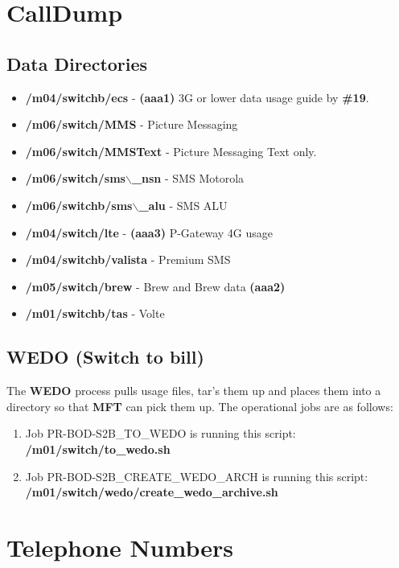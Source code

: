 \documentclass[12pt,twoside]{article}
\begin{document}
\normalsize
\section{CallDump}
\label{sec:orgheadline153}
\subsection{Data Directories}
\label{sec:orgheadline151}
\begin{itemize}
\item \textbf{/m04/switchb/ecs} - \textbf{(aaa1)} 3G or lower data usage guide by \textbf{\#19}.
\item \textbf{/m06/switch/MMS} - Picture Messaging
\item \textbf{/m06/switch/MMSText} - Picture Messaging Text only.
\item \textbf{/m06/switch/sms$\backslash$\_nsn} - SMS Motorola
\item \textbf{/m06/switchb/sms$\backslash$\_alu} - SMS ALU
\item \textbf{/m04/switch/lte} - \textbf{(aaa3)} P-Gateway 4G usage
\item \textbf{/m04/switchb/valista} - Premium SMS
\item \textbf{/m05/switch/brew} - Brew and Brew data \textbf{(aaa2)}
\item \textbf{/m01/switchb/tas} - Volte
\end{itemize}

\subsection{WEDO (Switch to bill)}
\label{sec:orgheadline152}
The \textbf{WEDO} process pulls usage files, tar's them up and places them
into a directory so that \textbf{MFT} can pick them up. The operational
jobs are as follows:

\begin{enumerate}
\item Job PR-BOD-S2B\_TO\_WEDO is running this script:
\textbf{/m01/switch/to\_wedo.sh}
\item Job PR-BOD-S2B\_CREATE\_WEDO\_ARCH is running this script:
\textbf{/m01/switch/wedo/create\_wedo\_archive.sh}
\end{enumerate}

\newpage
\section{Telephone Numbers}
\label{sec:orgheadline154}
\end{document}

